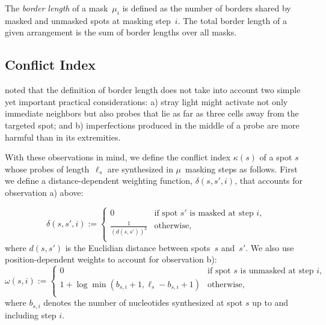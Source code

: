 \documentclass{bioinfo}
\begin{document}
The \emph{border length} of a mask~$\mu_{i}$ is defined as the number of borders shared by masked and unmasked spots at masking step~$i$. The total border length of a given arrangement is the sum of border lengths over all masks.

\subsection{Conflict Index}

\citealp{KAHNG03_1} noted that the definition of border length does not take into account two simple yet important practical considerations: a) stray light might activate not only immediate neighbors but also probes that lie as far as three cells away from the targeted spot; and b) imperfections produced in the middle of a probe are more harmful than in its extremities.

With these observations in mind, we define the conflict index $\kappa(s)$ of a spot $s$ whose probes of length~$\ell_{s}$ are synthesized in $\mu$~masking steps as follows. First we define a distance-dependent weighting function, $\delta(s,s',i)$, that accounts for observation a) above:

\begin{equation}
\label{eq:dist_weight} \delta(s,s',i) :=
        \left\{
                \begin{array}{ll}
                        0 & \mbox{if spot $s'$ is masked at step $i$}, \\
                        \frac{1}{(d(s,s'))^{2}} & \mbox{otherwise}, \\
                \end{array}
        \right.
\end{equation}
where $d(s,s')$ is the Euclidian distance between spots~$s$ and~$s'$. We also use position-dependent weights to account for observation b):
\begin{equation}
\label{eq:pos_mult} \omega(s,i) :=
        \left\{
                \begin{array}{ll}
                        0 & \mbox{if spot $s$ is unmasked at step $i$}, \\
                        1 + \log{\min(b_{s,i} + 1,\ell_{s} - b_{s,i} + 1)} & \mbox{otherwise}, \\
                \end{array}
        \right.
\end{equation}
where $b_{s,i}$ denotes the number of nucleotides synthesized at spot $s$ up to and including step $i$.
\end{document}
